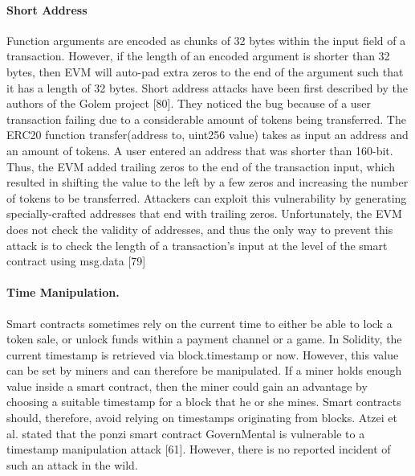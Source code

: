         \paragraph{Short Address}
            Function arguments are encoded as chunks of 32 bytes within the input field of a transaction.
            However, if the length of an encoded argument is shorter than 32 bytes, then EVM will auto-pad extra zeros to the end of the argument such that it has a length of 32 bytes.
            Short address attacks have been first described by the authors of the Golem project [80].
            They noticed the bug because of a user transaction failing due to a considerable amount of tokens being transferred.
            The ERC20 function transfer(address to, uint256 value) takes as input an address and an amount of tokens.
            A user entered an address that was shorter than 160-bit. Thus, the EVM added trailing zeros to the end of the transaction input, which resulted in shifting the value to the left by a few zeros and increasing the number of tokens to be transferred.
            Attackers can exploit this vulnerability by generating specially-crafted addresses that end with trailing zeros.
            Unfortunately, the EVM does not check the validity of addresses, and thus the only way to prevent this attack is to check the length of a transaction’s input at the level of the smart contract using msg.data [79]
        
        \paragraph{Time Manipulation.}
            Smart contracts sometimes rely on the current time to either be able to lock a token sale, or unlock funds within a payment channel or a game.
            In Solidity, the current timestamp is retrieved via block.timestamp or now.
            However, this value can be set by miners and can therefore be manipulated.
            If a miner holds enough value inside a smart contract, then the miner could gain an advantage by choosing a suitable timestamp for a block that he or she mines.
            Smart contracts should, therefore, avoid relying on timestamps originating from blocks.
            Atzei et al. stated that the ponzi smart contract GovernMental is vulnerable to a timestamp manipulation attack [61].
            However, there is no reported incident of such an attack in the wild.
        
